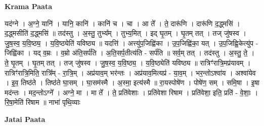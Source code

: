 \documentclass[17pt]{extarticle}
\begin{document}
\textbf{Krama Paata} \newline

यद॑ग्ने । अ॒ग्ने॒ यानि॑ । यानि॒ कानि॑ । कानि॑ च । चा । आ ते᳚ । ते॒ दारू॑णि । दारू॑णि द॒द्ध्मसि॑ । द॒द्ध्मसीति॑ द॒द्ध्मसि॑ ॥ तद॑स्तु । अ॒स्तु॒ तुभ्य᳚म् । तुभ्य॒मित् । इद् घृ॒तम् । घृ॒तम् तत् । तज् जु॑षस्व । जु॒ष॒स्व॒ य॒वि॒ष्ठ्य॒ । य॒वि॒ष्ठ्येति॑ यविष्ठ्य ॥ यदत्ति॑ । अत्त्यु॑प॒जिह्वि॑का । उ॒प॒जिह्वि॑का॒ यत् । उ॒प॒जिह्वि॒केत्यु॑प - जिह्वि॑का । यद् व॒म्रः । व॒म्रो अ॑ति॒सर्प॑ति । अ॒ति॒सर्प॒तीत्य॑ति - सर्प॑ति ॥ सर्व॒म् तत् । तद॑स्तु । अ॒स्तु॒ ते॒ । ते॒ घृ॒तम् । घृ॒तम् तत् । तज् जु॑षस्व । जु॒ष॒स्व॒ य॒वि॒ष्ठ्य॒ । य॒वि॒ष्ठ्येति॑ यविष्ठ्य ॥ रात्रिꣳ॑रात्रि॒मप्र॑यावम् । रात्रिꣳ॑रात्रि॒मिति॒ रात्रि᳚म् - रा॒त्रि॒म् । अप्र॑याव॒म् भर॑न्तः । अप्र॑याव॒मित्यप्र॑ - या॒व॒म् । भर॒न्तोऽश्वा॑य । अश्वा॑येव । इ॒व॒ तिष्ठ॑ते । तिष्ठ॑ते घा॒सम् । घा॒सम॑स्मै । अ॒स्मा॒ इत्य॑स्मै ॥ रा॒यस्पोषे॑ण । पोषे॑ण॒ सम् । समि॒षा । इ॒षा मद॑न्तः । मद॒न्तोऽग्ने᳚ । अग्ने॒ मा । मा ते᳚ । ते॒ प्रति॑वेशाः । प्रति॑वेशा रिषाम । प्रति॑वेशा॒ इति॒ प्रति॑ - वे॒शाः॒ । रि॒षा॒मेति॑ रिषाम ॥ नाभा॑ पृथि॒व्याः \newline

\textbf{Jatai Paata} \newline
\end{document}
